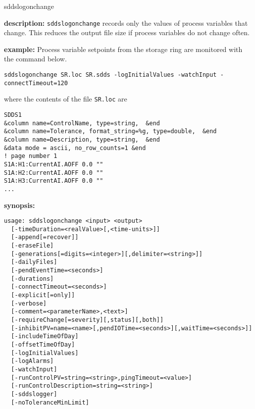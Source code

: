 \begin{sddsprog}{sddslogonchange}
\item \textbf{description:}
\verb+sddslogonchange+ records only the values of process variables that change. This reduces the output file size if process variables do not change often.
\item \textbf{example:} 
% 
Process variable setpoints from the storage ring are monitored
with the command below.
\begin{verbatim}
sddslogonchange SR.loc SR.sdds -logInitialValues -watchInput -connectTimeout=120
\end{verbatim}
where the contents of the file \verb+SR.loc+ are
\begin{verbatim}
SDDS1
&column name=ControlName, type=string,  &end
&column name=Tolerance, format_string=%g, type=double,  &end
&column name=Description, type=string,  &end
&data mode = ascii, no_row_counts=1 &end
! page number 1
S1A:H1:CurrentAI.AOFF 0.0 ""
S1A:H2:CurrentAI.AOFF 0.0 ""
S1A:H3:CurrentAI.AOFF 0.0 ""
...
\end{verbatim}
\item \textbf{synopsis:} 
\begin{verbatim}
usage: sddslogonchange <input> <output> 
  [-timeDuration=<realValue>[,<time-units>]]
  [-append[=recover]] 
  [-eraseFile]
  [-generations[=digits=<integer>][,delimiter=<string>]]
  [-dailyFiles]
  [-pendEventTime=<seconds>] 
  [-durations] 
  [-connectTimeout=<seconds>]
  [-explicit[=only]] 
  [-verbose] 
  [-comment=<parameterName>,<text>]
  [-requireChange[=severity][,status][,both]]
  [-inhibitPV=name=<name>[,pendIOTime=<seconds>][,waitTime=<seconds>]]
  [-includeTimeOfDay] 
  [-offsetTimeOfDay]
  [-logInitialValues]
  [-logAlarms]
  [-watchInput]
  [-runControlPV=string=<string>,pingTimeout=<value>]
  [-runControlDescription=string=<string>]
  [-sddslogger]
  [-noToleranceMinLimit]


\end{verbatim}
\end{sddsprog}
